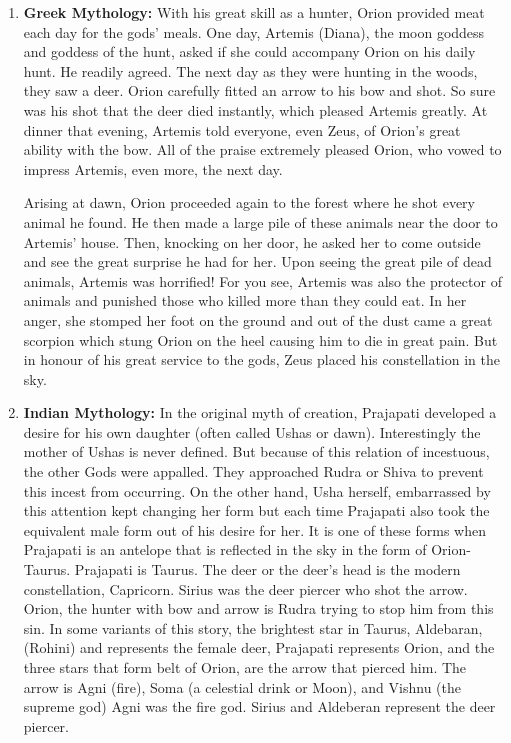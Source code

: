 \documentclass[a4paper,twoside,11pt]{article}
\numberwithin{equation}{section}
\begin{document}
\begin{enumerate}
    \item \textbf{Greek Mythology:} With his great skill as a hunter, Orion provided meat each day for the gods’ meals. One day, Artemis (Diana), the moon goddess and goddess of the hunt, asked if she could accompany Orion on his daily hunt. He readily agreed. The next day as they were hunting in the woods, they saw a deer. Orion carefully fitted an arrow to his bow and shot. So sure was his shot that the deer died instantly, which pleased Artemis greatly. At dinner that evening, Artemis told everyone, even Zeus, of Orion’s great ability with the bow. All of the praise extremely pleased Orion, who vowed to impress Artemis, even more, the next day. 
    
    Arising at dawn, Orion proceeded again to the forest where he shot every animal he found. He then made a large pile of these animals near the door to Artemis’ house. Then, knocking on her door, he asked her to come outside and see the great surprise he had for her. Upon seeing the great pile of dead animals, Artemis was horrified! For you see, Artemis was also the protector of animals and punished those who killed more than they could eat. In her anger, she stomped her foot on the ground and out of the dust came a great scorpion which stung Orion on the heel causing him to die in great pain. But in honour of his great service to the gods, Zeus placed his constellation in the sky.
    \item \textbf{Indian Mythology:} In the original myth of creation, Prajapati developed a desire for his own daughter (often called Ushas or dawn). Interestingly the mother of Ushas is never defined. But because of this relation of incestuous, the other Gods were appalled. They approached Rudra or Shiva to prevent this incest from occurring. On the other hand, Usha herself, embarrassed by this attention kept changing her form but each time Prajapati also took the equivalent male form out of his desire for her. It is one of these forms when Prajapati is an antelope that is reflected in the sky in the form of Orion-Taurus. Prajapati is Taurus. The deer or the deer's head is the modern constellation, Capricorn. Sirius was the deer piercer who shot the arrow. Orion, the hunter with bow and arrow is Rudra trying to stop him from this sin. In some variants of this story, the brightest star in Taurus, Aldebaran, (Rohini) and represents the female deer, Prajapati represents Orion, and the three stars that form belt of Orion, are the arrow that pierced him. The arrow is Agni (fire), Soma (a celestial drink or Moon), and Vishnu (the supreme god) Agni was the fire god. Sirius and Aldeberan represent the deer piercer.
\end{enumerate}
\end{document}
